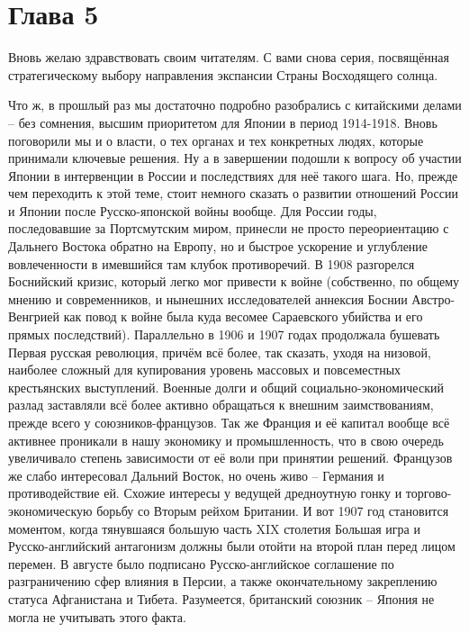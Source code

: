 
\chapter{Глава 5}

Вновь желаю здравствовать своим читателям. С вами снова серия, посвящённая стратегическому выбору направления экспансии Страны Восходящего солнца.

Что ж, в прошлый раз мы достаточно подробно разобрались с китайскими делами – без сомнения, высшим приоритетом для Японии в период 1914-1918. Вновь поговорили мы и о власти, о тех органах и тех конкретных людях, которые принимали ключевые решения. Ну а в завершении подошли к вопросу об участии Японии в интервенции в России и последствиях для неё такого шага. Но, прежде чем переходить к этой теме, стоит немного сказать о развитии отношений России и Японии после Русско-японской войны вообще. Для России годы, последовавшие за Портсмутским миром, принесли не просто переориентацию с Дальнего Востока обратно на Европу, но и быстрое ускорение и углубление вовлеченности в имевшийся там клубок противоречий. В 1908 разгорелся Боснийский кризис, который легко мог привести к войне (собственно, по общему мнению и современников, и нынешних исследователей аннексия Боснии Австро-Венгрией как повод к войне была куда весомее Сараевского убийства и его прямых последствий). Параллельно в 1906 и 1907 годах продолжала бушевать Первая русская революция, причём всё более, так сказать, уходя на низовой, наиболее сложный для купирования уровень массовых и повсеместных крестьянских выступлений. Военные долги и общий социально-экономический разлад заставляли всё более активно обращаться к внешним заимствованиям, прежде всего у союзников-французов. Так же Франция и её капитал вообще всё активнее проникали в нашу экономику и промышленность, что в свою очередь увеличивало степень зависимости от её воли при принятии решений. Французов же слабо интересовал Дальний Восток, но очень живо – Германия и противодействие ей. Схожие интересы у ведущей дредноутную гонку и торгово-экономическую борьбу со Вторым рейхом Британии. И вот 1907 год становится моментом, когда тянувшаяся большую часть XIX столетия Большая игра и Русско-английский антагонизм должны были отойти на второй план перед лицом перемен. В августе было подписано Русско-английское соглашение по разграничению сфер влияния в Персии, а также окончательному закреплению статуса Афганистана и Тибета. Разумеется, британский союзник – Япония не могла не учитывать этого факта.

